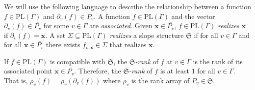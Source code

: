 \documentclass{amsart}
\begin{document}
	We will use the following language to describe the relationship between a function $f \in \mathrm{PL}(\Gamma)$ and $\partial_v(f) \in \overline{P_v}$. A function $f \in \mathrm{PL}(\Gamma)$ and the vector $\partial_v(f) \in \overline{P_v}$ for some $v \in \Gamma$ are \textit{associated}. Given $\mathbf{x} \in \overline{P_v}$, $f \in \mathrm{PL}(\Gamma)$ \textit{realizes} $\mathbf{x}$ if $\partial_v(f) = \mathbf{x}$. A set $\Sigma \subseteq \mathrm{PL}(\Gamma)$ \textit{realizes} a slope structure $\mathfrak{S}$ if for all $v \in \Gamma$ and for all $\mathbf{x} \in \overline{P_v}$ there exists $f_{v, \mathbf{x}} \in \Sigma$ that realizes $\mathbf{x}$.
	
	If $f \in \mathrm{PL}(\Gamma)$ is compatible with $\mathfrak{S}$, the \textit{$\mathfrak{S}$-rank} of $f$ at $v \in \Gamma$ is the rank of its associated point $\mathbf{x} \in \overline{P_v}$. Therefore, the \textit{$\mathfrak{S}$-rank} of $f$ is at least $1$ for all $v \in \Gamma$. That is, $\rho_v(f) = \rho_v(\partial_v(f))$ where $\rho_v$ is the rank array of $P_v \in \mathfrak{S}$.
	
\end{document}
